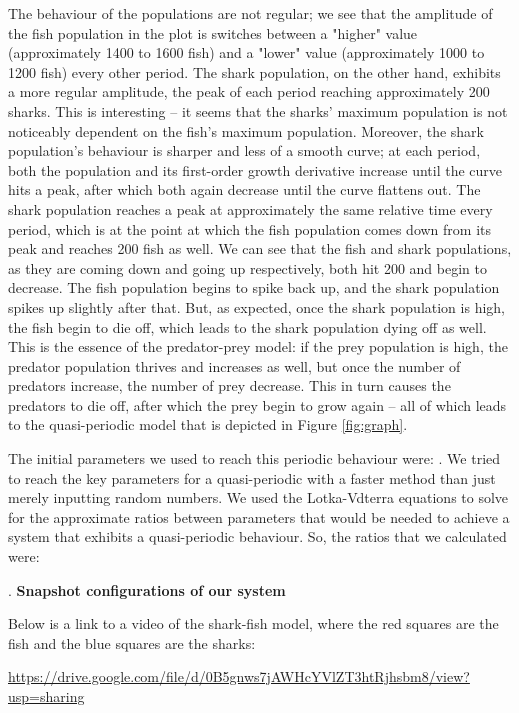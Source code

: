 \documentclass{article}
\begin{document}
The behaviour of the populations are not regular; we see that the amplitude of the fish population in the plot is switches between a "higher" value (approximately 1400 to 1600 fish) and a "lower" value (approximately 1000 to 1200 fish) every other period. The shark population, on the other hand, exhibits a more regular amplitude, the peak of each period reaching approximately 200 sharks. This is interesting -- it seems that the sharks' maximum population is not noticeably dependent on the fish's maximum population. Moreover, the shark population's behaviour is sharper and less of a smooth curve; at each period, both the population and its first-order growth derivative increase until the curve hits a peak, after which both again decrease until the curve flattens out. The shark population reaches a peak at approximately the same relative time every period, which is at the point at which the fish population comes down from its peak and reaches 200 fish as well. We can see that the fish and shark populations, as they are coming down and going up respectively, both hit 200 and begin to decrease. The fish population begins to spike back up, and the shark population spikes up slightly after that. But, as expected, once the shark population is high, the fish begin to die off, which leads to the shark population dying off as well. This is the essence of the predator-prey model: if the prey population is high, the predator population thrives and increases as well, but once the number of predators increase, the number of prey decrease. This in turn causes the predators to die off, after which the prey begin to grow again -- all of which leads to the quasi-periodic model that is depicted in Figure \ref{fig:graph}.\par 
The initial parameters we used to reach this periodic behaviour were: . We tried to reach the key parameters for a quasi-periodic with a faster method than just merely inputting random numbers. We used the Lotka-Vdterra equations to solve for the approximate ratios between parameters that would be needed to achieve a system that exhibits a quasi-periodic behaviour. So, the ratios that we calculated were:\par
\bigskip
{}. \textbf{Snapshot configurations of our system}\par
Below is a link to a video of the shark-fish model, where the red squares are the fish and the blue squares are the sharks:\par
\url{
https://drive.google.com/file/d/0B5gnws7jAWHcYVlZT3htRjhsbm8/view?usp=sharing
}\par
\end{document}
